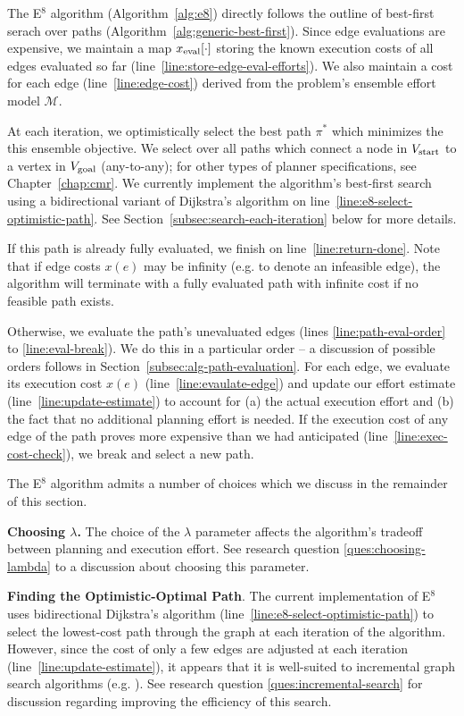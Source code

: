 The E$^8$ algorithm (Algorithm~\ref{alg:e8})
directly follows the outline
of best-first serach over paths
(Algorithm~\ref{alg:generic-best-first}).
Since edge evaluations are expensive,
we maintain a map $x_{\mbox{\scriptsize eval}}[\cdot]$
storing the known execution costs of all edges evaluated so far
(line~\ref{line:store-edge-eval-efforts}).
We also maintain a cost for each edge (line~\ref{line:edge-cost})
derived from the problem's ensemble effort model $\mathcal{M}$.

At each iteration,
we optimistically select the best path $\pi^*$
which minimizes the this ensemble objective.
We select over all paths which connect
a node in $V_{\mbox{\scriptsize start}}$
to a vertex in $V_{\mbox{\scriptsize goal}}$
(any-to-any);
for other types of planner specifications,
see Chapter~\ref{chap:cmr}.
We currently implement the algorithm's best-first search
using a bidirectional variant of
Dijkstra's algorithm \cite{dijkstra1959anote}
on line~\ref{line:e8-select-optimistic-path}.
See Section~\ref{subsec:search-each-iteration} below
for more details.

If this path is already fully evaluated,
we finish on line~\ref{line:return-done}.
Note that if edge costs $x(e)$ may be infinity
(e.g. to denote an infeasible edge),
the algorithm will terminate with a fully evaluated path
with infinite cost if no feasible path exists.

Otherwise,
we evaluate the path's unevaluated edges
(lines \ref{line:path-eval-order}
to \ref{line:eval-break}).
We do this in a particular order --
a discussion of possible orders follows in 
Section~\ref{subsec:alg-path-evaluation}.
For each edge,
we evaluate its execution cost $x(e)$ (line~\ref{line:evaulate-edge})
and update our effort estimate (line~\ref{line:update-estimate})
to account for (a) the actual execution effort
and (b) the fact that no additional planning effort is needed.
If the execution cost of any edge of the path proves
more expensive than we had anticipated
(line~\ref{line:exec-cost-check}),
we break and select a new path.

The E$^8$ algorithm admits a number of choices
which we discuss in the remainder of this section.

\textbf{Choosing $\lambda$.}
The choice of the $\lambda$ parameter
affects the algorithm's tradeoff between planning and execution effort.
See research question \ref{ques:choosing-lambda}
to a discussion about choosing this parameter.

\textbf{Finding the Optimistic-Optimal Path}.
The current implementation of E$^8$ uses
bidirectional Dijkstra's algorithm
(line~\ref{line:e8-select-optimistic-path})
to select the lowest-cost path through the graph
at each iteration of the algorithm.
However, since the cost of only a few edges
are adjusted at each iteration (line~\ref{line:update-estimate}),
it appears that it is well-suited to incremental
graph search algorithms (e.g. \cite{koenig2004lpastar}).
See research question \ref{ques:incremental-search}
for discussion regarding improving the efficiency of this search.

